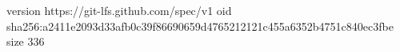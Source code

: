 version https://git-lfs.github.com/spec/v1
oid sha256:a2411e2093d33afb0c39f86690659d4765212121c455a6352b4751c840ec3fbe
size 336
